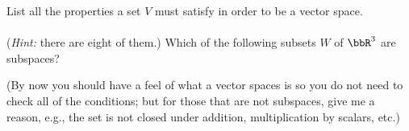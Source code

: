 \begin{questions}
  \question[12] List all the properties a set $V$ must
  satisfy in order to be a vector space.
  \\\\
  (\emph{Hint:} there are eight of them.)
  \vskip 7cm
  \hrulefill
  \question Which of the following subsets $W$ of $\bbR^3$ are subspaces?
  (By now you should have a feel of what a vector spaces is so you do not
  need to check all of the conditions; but for those that are not
  subspaces, give me a reason, e.g., the set is not closed under addition,
  multiplication by scalars, etc.)
\end{questions}

